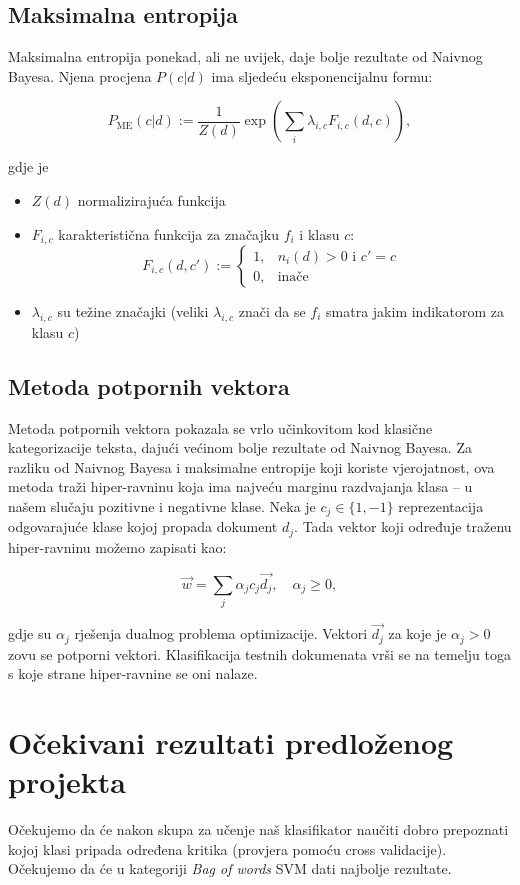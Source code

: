 \documentclass[12pt,a4paper,titlepage]{article}
\begin{document}
\subsection{Maksimalna entropija}

Maksimalna entropija ponekad, ali ne uvijek, daje bolje rezultate od Naivnog Bayesa. Njena procjena $P(c|d)$ ima sljedeću eksponencijalnu formu:

\[
  P_\text{ME}(c|d) := \frac{1}{Z(d)} \exp \left(\sum_i \lambda_{i,c} F_{i,c}(d,c)\right),
\]

gdje je

\begin{itemize}
  \item $Z(d)$ normalizirajuća funkcija
  \item $F_{i,c}$ karakteristična funkcija za značajku $f_i$ i klasu $c$:
    \[
      F_{i,c}(d,c') := \begin{cases}
                         1, & n_i(d) > 0 \text{ i } c' = c\\
                         0, & \text{inače}
                       \end{cases}
    \]
  \item $\lambda_{i,c}$ su težine značajki (veliki $\lambda_{i,c}$ znači da se $f_i$ smatra jakim indikatorom za klasu $c$)
\end{itemize}

\subsection{Metoda potpornih vektora}

Metoda potpornih vektora pokazala se vrlo učinkovitom kod klasične kategorizacije teksta, dajući većinom bolje rezultate od Naivnog Bayesa. Za razliku od Naivnog Bayesa i maksimalne entropije koji koriste vjerojatnost, ova metoda traži hiper-ravninu koja ima najveću marginu razdvajanja klasa -- u našem slučaju pozitivne i negativne klase. Neka je $c_j \in \{1, -1\}$ reprezentacija odgovarajuće klase kojoj propada dokument $d_j$. Tada vektor koji određuje traženu hiper-ravninu možemo zapisati kao:

\[
	\vec{w} = \sum_j \alpha_j c_j \vec{d_j}, \quad \alpha_j \ge 0,
\]

gdje su $\alpha_j$ rješenja dualnog problema optimizacije. Vektori $\vec{d_j}$ za koje je $\alpha_j > 0$ zovu se potporni vektori. Klasifikacija testnih dokumenata vrši se na temelju toga s koje strane hiper-ravnine se oni nalaze.

\section{Očekivani rezultati predloženog projekta}

Očekujemo da će nakon skupa za učenje naš klasifikator naučiti dobro prepoznati kojoj klasi pripada određena kritika (provjera pomoću cross validacije). Očekujemo da će u kategoriji \textit{Bag of words} SVM dati najbolje rezultate.

\newpage

\nocite{*}



\end{document}
